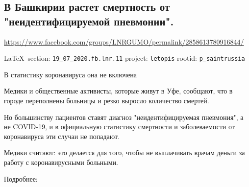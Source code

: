  
 
  
\subsection{В Башкирии растет смертность от "неидентифицируемой пневмонии".}
\label{sec:19_07_2020.fb.lnr.11}
\url{https://www.facebook.com/groups/LNRGUMO/permalink/2858613780916844/}

\vspace{0.5cm}
{\small\LaTeX~section: \verb|19_07_2020.fb.lnr.11| project: \verb|letopis| rootid: \verb|p_saintrussia|}
\vspace{0.5cm}

В статистику коронавируса она не включена

Медики и общественные активисты, которые живут в Уфе, сообщают, что в городе переполнены больницы и резко выросло количество смертей.

Но большинству пациентов ставят диагноз "неидентифицируемая пневмония", а не COVID-19, и в официальную статистику смертности и заболеваемости от коронавируса эти случаи не попадают.

Медики считают: это делается для того, чтобы не выплачивать врачам деньги за работу с коронавирусными больными.

Подробнее: 
